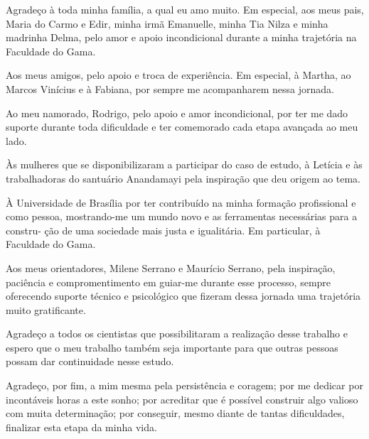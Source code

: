 \begin{agradecimentos}

    Agradeço à toda minha família, a qual eu amo muito. Em especial, aos meus pais,
    Maria do Carmo e Edir, minha irmã Emanuelle, minha Tia Nilza e minha madrinha
    Delma, pelo amor e apoio incondicional durante a minha trajetória na Faculdade do Gama.
    
    Aos meus amigos, pelo apoio e troca de experiência. Em especial, à Martha, ao Marcos
    Vinícius e à Fabiana, por sempre me acompanharem nessa jornada. 
    
    Ao meu namorado, Rodrigo, pelo apoio e amor incondicional, por ter me dado
    suporte durante toda dificuldade e ter comemorado cada etapa avançada ao meu lado.
    
    Às mulheres que se disponibilizaram a participar do caso de estudo, à Letícia e às trabalhadoras do santuário Anandamayi pela inspiração que deu origem ao tema.
    
    À Universidade de Brasília por ter contribuído na minha formação profissional e
    como pessoa, mostrando-me um mundo novo e as ferramentas necessárias para a constru-
    ção de uma sociedade mais justa e igualitária. Em particular, à Faculdade do Gama.
    
    Aos meus orientadores, Milene Serrano e Maurício Serrano, pela inspiração, paciência e compromentimento 
    em guiar-me durante esse processo, sempre oferecendo suporte técnico e psicológico que fizeram 
    dessa jornada uma trajetória muito gratificante. 
    
    Agradeço a todos os cientistas que possibilitaram a realização desse trabalho e espero que 
    o meu trabalho também seja importante para que outras pessoas possam dar continuidade nesse 
    estudo. 
    
    Agradeço, por fim, a mim mesma pela persistência e coragem; por me dedicar por
    incontáveis horas a este sonho; por acreditar que é possível construir algo valioso com muita determinação; 
    por conseguir, mesmo diante de tantas
    dificuldades, finalizar esta etapa da minha vida.
    
    \end{agradecimentos}
    